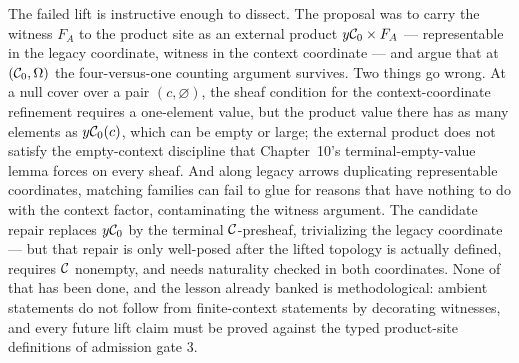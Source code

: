 \begin{remark}
\label{ch12:rem:ambientlift}
The failed lift is instructive enough to dissect. The proposal was to
carry the witness $F_A$ to the product site as an external product
$y\mathcal{C}_0 \times F_A$ --- representable in the legacy coordinate, witness
in the context coordinate --- and argue that at $(\mathcal{C}_0, \Omega)$ the
four-versus-one counting argument survives. Two things go wrong. At a
null cover over a pair $(c, \varnothing)$, the sheaf condition for the
context-coordinate refinement requires a one-element value, but the
product value there has as many elements as $y\mathcal{C}_0(c)$, which can be
empty or large; the external product does not satisfy the empty-context
discipline that Chapter~10's terminal-empty-value lemma forces on every
sheaf. And along legacy arrows duplicating representable coordinates,
matching families can fail to glue for reasons that have nothing to do
with the context factor, contaminating the witness argument. The
candidate repair replaces $y\mathcal{C}_0$ by the terminal $\mathcal{C}$-presheaf,
trivializing the legacy coordinate --- but that repair is only
well-posed after the lifted topology is actually defined, requires
$\mathcal{C}$ nonempty, and needs naturality checked in both coordinates. None
of that has been done, and the lesson already banked is
methodological: ambient statements do not follow from finite-context
statements by decorating witnesses, and every future lift claim must be
proved against the typed product-site definitions of admission gate 3.
\end{remark}

